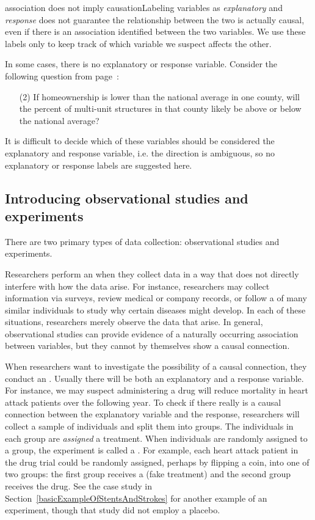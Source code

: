 \begin{caution}{association does not imply causation}{Labeling variables as \emph{explanatory} and \emph{response} does not guarantee the relationship between the two is actually causal, even if there is an association identified between the two variables. We use these labels only to keep track of which variable we suspect affects the other.}
\end{caution}

In some cases, there is no explanatory or response variable. Consider the following question from page~\pageref{ownershipMultiUnitQuestion}:
\begin{enumerate}
\item[(2)] 
	If homeownership is lower than the national average in one county, will the percent of multi-unit structures in that county likely be above or below the national average?
\end{enumerate}
It is difficult to decide which of these variables should be considered the explanatory and response variable, i.e. the direction is ambiguous, so no explanatory or response labels are suggested here.


\subsection{Introducing observational studies and experiments}

There are two primary types of data collection: observational studies and experiments.

Researchers perform an  when they collect data in a way that does not directly interfere with how the data arise. For instance, researchers may collect information via surveys, review medical or company records, or follow a  of many similar individuals to study why certain diseases might develop. In each of these situations, researchers merely observe the data that arise. In general, observational studies can provide evidence of a naturally occurring association between variables, but they cannot by themselves show a causal connection.

When researchers want to investigate the possibility of a causal connection, they conduct an . Usually there will be both an explanatory and a response variable. For instance, we may suspect administering a drug will reduce mortality in heart attack patients over the following year. To check if there really is a causal connection between the explanatory variable and the response, researchers will collect a sample of individuals and split them into groups. The individuals in each group are \emph{assigned} a treatment. When individuals are randomly assigned to a group, the experiment is called a . For example, each heart attack patient in the drug trial could be randomly assigned,  perhaps by flipping a coin, into one of two groups: the first group receives a  (fake treatment) and the second group receives the drug. See the case study in Section~\ref{basicExampleOfStentsAndStrokes} for another example of an experiment, though that study did not employ a placebo.

